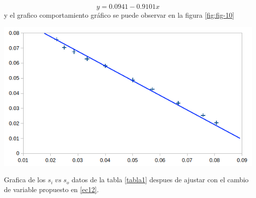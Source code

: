 \documentclass[13,twocolumn,letterpaper]{article}
\newenvironment{Figure}{\par\medskip\noindent\minipage{\linewidth}}{\endminipage\par\medskip}
\begin{document}
\begin{multicols}{2}
\begin{equation}
	y=0.0941-0.9101x
\end{equation}
y el grafico comportamiento gráfico se puede observar en la figura \ref{fig:fig-10}
\begin{Figure}
	\centering
	\includegraphics[width=\linewidth]{fig10}
	\caption{\footnotesize{Grafica de los $s_{i}\;vs\;s_{o}$ datos de la tabla \ref{tabla1} despues de ajustar con el cambio de variable propuesto en \ref{ec12}.}}
	\label{fig:fig-10}
\end{Figure} 


\end{multicols}
\end{document}
